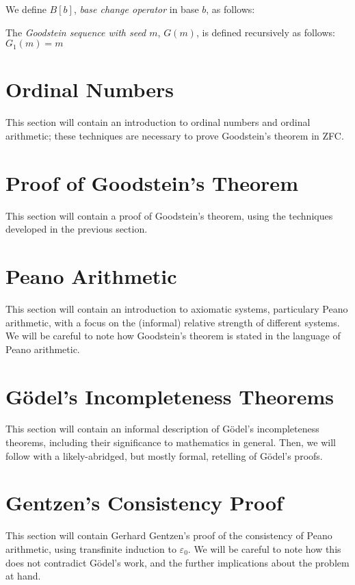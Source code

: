 \documentclass[10pt]{article}
\newcommand{\epz}{\varepsilon_0}
\begin{document}
\begin{define}
We define $B[b]$, \emph{base change operator} in base $b$, as follows:
\end{define}


\begin{define}
The \emph{Goodstein sequence with seed $m$}, $G(m)$, is defined recursively as follows:
$G_1(m) = m$
\end{define}



\section{Ordinal Numbers}
This section will contain an introduction to ordinal numbers and ordinal arithmetic; these techniques are necessary to prove Goodstein's theorem in ZFC.

\section{Proof of Goodstein's Theorem}
This section will contain a proof of Goodstein's theorem, using the techniques developed in the previous section.

\section{Peano Arithmetic}
This section will contain an introduction to axiomatic systems, particulary Peano arithmetic, with a focus on the (informal) relative strength of different systems.
We will be careful to note how Goodstein's theorem is stated in the language of Peano arithmetic.

\section{G{\"o}del's Incompleteness Theorems}
This section will contain an informal description of G{\"o}del's incompleteness theorems, including their significance to mathematics in general.
Then, we will follow with a likely-abridged, but mostly formal, retelling of G{\"o}del's proofs.

\section{Gentzen's Consistency Proof}
This section will contain Gerhard Gentzen's proof of the consistency of Peano arithmetic, using transfinite induction to $\epz$.
We will be careful to note how this does not contradict G{\"o}del's work, and the further implications about the problem at hand.
\end{document}
